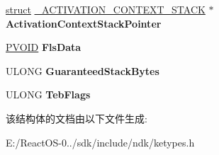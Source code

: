 \begin{DoxyCompactItemize}
\hyperlink{interfacestruct}{struct} \hyperlink{struct___a_c_t_i_v_a_t_i_o_n___c_o_n_t_e_x_t___s_t_a_c_k}{\+\_\+\+A\+C\+T\+I\+V\+A\+T\+I\+O\+N\+\_\+\+C\+O\+N\+T\+E\+X\+T\+\_\+\+S\+T\+A\+CK} $\ast$ {\bfseries Activation\+Context\+Stack\+Pointer}
\item 
\mbox{\label{struct___f_i_b_e_r_ae6f57492e01965394a590620906317bd}} 
\hyperlink{interfacevoid}{P\+V\+O\+ID} {\bfseries Fls\+Data}
\item 
\mbox{\label{struct___f_i_b_e_r_a8e66cbbf77df8c93e5b305349457ba83}} 
U\+L\+O\+NG {\bfseries Guaranteed\+Stack\+Bytes}
\item 
\mbox{\label{struct___f_i_b_e_r_ab7ccdca9500161d6f891495178f18e06}} 
U\+L\+O\+NG {\bfseries Teb\+Flags}
\end{DoxyCompactItemize}


该结构体的文档由以下文件生成\+:\begin{DoxyCompactItemize}
\item 
E\+:/\+React\+O\+S-\/0../sdk/include/ndk/ketypes.\+h\end{DoxyCompactItemize}
